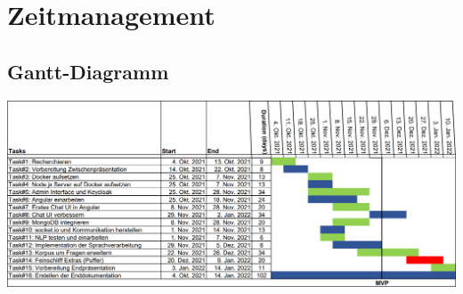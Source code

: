 \section{Zeitmanagement}

\subsection{Gantt-Diagramm}

\includegraphics[width=1.0\textwidth]{bilder/zeitmanagement/gantt-diagramm.png}